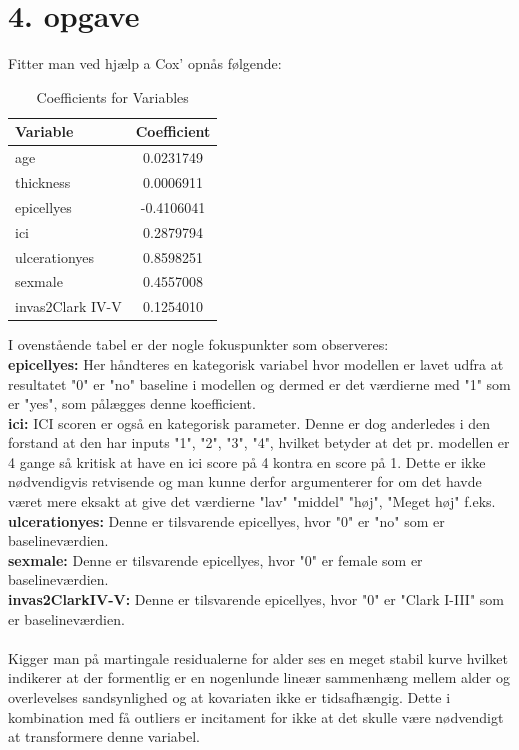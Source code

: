 \chapter{4. opgave}
Fitter man ved hjælp a Cox' opnås følgende:
\begin{table}[H]
\centering
\begin{tabular}{|l|c|}
\hline
\textbf{Variable} & \textbf{Coefficient} \\
\hline
age & 0.0231749 \\
thickness & 0.0006911 \\
epicellyes & -0.4106041 \\
ici & 0.2879794 \\
ulcerationyes & 0.8598251 \\
sexmale & 0.4557008 \\
invas2Clark IV-V & 0.1254010 \\
\hline
\end{tabular}
\caption{Coefficients for Variables}
\label{tab:coefficients}
\end{table}
I ovenstående tabel er der nogle fokuspunkter som observeres:\\
\textbf{epicellyes:} Her håndteres en kategorisk variabel hvor modellen er lavet udfra at resultatet "0" er "no" baseline i modellen og dermed er det værdierne med "1" som er "yes", som pålægges denne koefficient.\\
\textbf{ici:} ICI scoren er også en kategorisk parameter. Denne er dog anderledes i den forstand at den har inputs "1", "2", "3", "4", hvilket betyder at det pr. modellen er 4 gange så kritisk at have en ici score på 4 kontra en score på 1. Dette er ikke nødvendigvis retvisende og man kunne derfor argumenterer for om det havde været mere eksakt at give det værdierne "lav" "middel" "høj", "Meget høj" f.eks.\\
\textbf{ulcerationyes:} Denne er tilsvarende epicellyes, hvor "0" er "no" som er baselineværdien.\\
\textbf{sexmale:} Denne er tilsvarende epicellyes, hvor "0" er female som er baselineværdien.\\
\textbf{invas2ClarkIV-V:} Denne er tilsvarende epicellyes, hvor "0" er "Clark I-III" som er baselineværdien.\\\\
Kigger man på martingale residualerne for alder ses en meget stabil kurve hvilket indikerer at der formentlig er en nogenlunde lineær sammenhæng mellem alder og overlevelses sandsynlighed og at kovariaten ikke er tidsafhængig. Dette i kombination med få outliers er incitament for ikke at det skulle være nødvendigt at transformere denne variabel.\\
